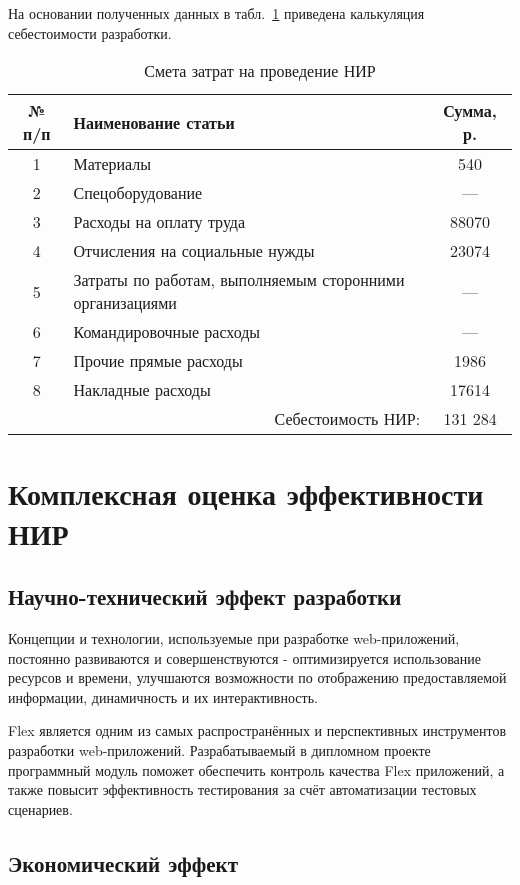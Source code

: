 На основании полученных данных в табл.~\ref{tab:calc} приведена калькуляция себестоимости разработки.

\begin{table}[ht]
\caption{Смета затрат на проведение НИР}
\begin{tabular}{|c|p{10cm}|c|}
\hline
№ п/п&Наименование статьи&Сумма, р.\\
\hline
1&Материалы&540\\
\hline
2&Спецоборудование&---\\
\hline
3&Расходы на оплату труда&88070\\
\hline
4&Отчисления на социальные нужды&23074\\
\hline
5&Затраты по работам, выполняемым сторонними организациями&---\\
\hline
6&Командировочные расходы&---\\
\hline
7&Прочие прямые расходы&1986\\
\hline
8&Накладные расходы&17614\\
\hline
\multicolumn{2}{|r|}{Себестоимость НИР:}&131 284\\
\hline
\end{tabular}
\label{tab:calc}
\end{table}

\section{Комплексная оценка эффективности НИР}

\subsection{Научно-технический эффект разработки}

Концепции и технологии, используемые при разработке web-приложений,
постоянно развиваются и совершенствуются - оптимизируется использование ресурсов и времени,
улучшаются возможности по отображению предоставляемой информации, динамичность и их интерактивность.

Flex является одним из самых распространённых и перспективных инструментов разработки web-приложений.
Разрабатываемый в дипломном проекте программный модуль поможет обеспечить контроль качества Flex
приложений, а также повысит эффективность тестирования за счёт автоматизации тестовых сценариев.

\subsection{Экономический эффект}

